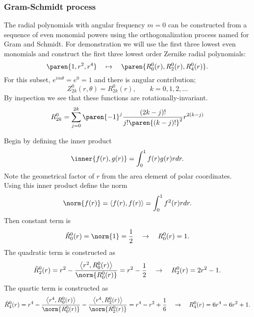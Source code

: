 \subsubsection{Gram-Schmidt process}
The radial polynomials with angular frequency $m=0$ can be constructed from a sequence of even monomial powers using the orthogonalization process named for Gram and Schmidt. For demonstration we will use the first three lowest even monomials and construct the first three lowest order Zernike radial polynomials:
\begin{equation*}
  \paren{1,r^{2},r^{4}} \quad \mapsto \quad \paren{R_{0}^{0}(r), R_{2}^{0}(r), R_{4}^{0}(r)}.
\end{equation*}
For this subset, $e^{im\theta} = e^{0} = 1$ and there is angular contribution;
\begin{equation}
  Z_{2k}^{0}(r,\theta) = R_{2k}^{0}(r), \qquad k = 0,1,2,\dots
\end{equation}
By inspection we see that these functions are rotationally-invariant.
\begin{equation}
  R_{2k}^{0} = \sum_{j=0}^{2k} { \paren{-1}^{j} \frac{(2k-j)!} {j! \paren{(k-j)!}^{2}} r^{2(k-j)}}
\label{eq:recursion}
\end{equation}

Begin by defining the inner product
\begin{equation*}
  \inner{f(r), g(r)} = \int_{0}^{1} f(r) g(r) r dr.
\end{equation*}
Note the geometrical factor of $r$ from the area element of polar coordinates. Using this inner product define the norm
\begin{equation*}
  \norm{f(r)} = \left< f(r), f(r) \right> = \int_{0}^{1} f^{2}(r) r dr.
\end{equation*}
Then constant term is
\begin{equation*}
  \tilde{R}_{0}^{0}(r) = \norm{1} = \frac{1} {2} \quad \to \quad R_{0}^{0}(r) = 1.
\end{equation*}
The quadratic term is constructed as
\begin{equation*}
  \tilde{R}_{2}^{0}(r) = r^{2} - \frac{ \left< r^{2}, R_{0}^{0}(r) \right> } {\norm{R_{0}^{0}(r)}} = r^{2} - \frac{1} {2} \quad \to \quad R_{2}^{0}(r) = 2r^{2} - 1.
\end{equation*}
The quartic term is constructed as
\begin{equation*}
  \tilde{R}_{4}^{0}(r) = r^{4} - \frac{ \left< r^{4}, R_{0}^{0}(r) \right> } {\norm{R_{0}^{0}(r)}} - \frac{ \left< r^{4}, R_{2}^{0}(r) \right> } {\norm{R_{2}^{0}(r)}} = r^{4} - r^{2} + \frac{1} {6} \quad \to \quad R_{4}^{0}(r) = 6r^{4} - 6r^{2} + 1.
\end{equation*}
%

